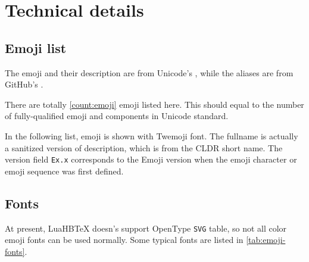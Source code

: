 \documentclass{l3doc}
\newcounter { emoji }
\def\LuaHBTeX{LuaHB\TeX}
\begin{document}
  

\section{ Technical details}

\subsection{ Emoji list}
\label{subsec:emoji-list}

The emoji and their description are from Unicode's
\href{https://www.unicode.org/Public/emoji/latest/emoji-test.txt}{},
while the aliases are from GitHub's
\href{https://github.com/github/gemoji/blob/master/db/emoji.json}{}.

There are totally \ref*{count:emoji} emoji listed here. This should equal to the number of
fully-qualified emoji and components in Unicode standard.

In the following list, emoji is shown with Twemoji font. The fullname is actually a sanitized
version of description, which is from the CLDR short name. The version field \texttt{Ex.x}
corresponds to the Emoji version when the emoji character or emoji sequence was first defined.

\EMOJITABLE

\subsection{ Fonts}

At present, \LuaHBTeX{} doesn's support OpenType \texttt{SVG} table, so not all color emoji fonts
can be used normally. Some typical fonts are listed in \autoref{tab:emoji-fonts}.

\begingroup

\def\y{\emoji{white-check-mark}}
\def\x{\emoji{negative-squared-cross-mark}}
\small
\end{document}

